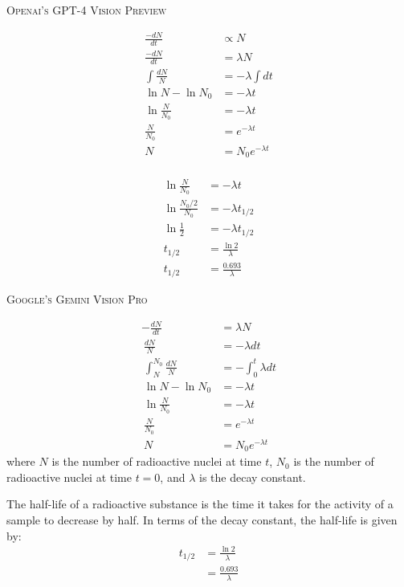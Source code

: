 \documentclass{article}
\begin{document}
\begin{center}
    \textsc{Openai's GPT-4 Vision Preview}
\end{center}

    \begin{align*}
        \frac{-dN}{dt} &\propto N \\
        \frac{-dN}{dt} &= \lambda N \\
        \int \frac{dN}{N} &= - \lambda \int dt \\
        \ln N - \ln N_0 &= -\lambda t \\
        \ln \frac{N}{N_0} &= -\lambda t \\
        \frac{N}{N_0} &= e^{-\lambda t} \\
        N &= N_0 e^{-\lambda t} \\
        \end{align*}
   
        \begin{align*}
        \ln \frac{N}{N_0} &= -\lambda t \\
        \ln \frac{N_0/2}{N_0} &= -\lambda t_{1/2} \\
        \ln \frac{1}{2} &= -\lambda t_{1/2} \\
        t_{1/2} &= \frac{\ln 2}{\lambda} \\
        t_{1/2} &= \frac{0.693}{\lambda}
        \end{align*}

        \pagebreak
\begin{center}
    \textsc{Google's Gemini Vision Pro}
\end{center}
        \begin{align*}
            -\frac{dN}{dt} &= \lambda N \\\
            \frac{dN}{N} &= -\lambda dt \\\
            \int_N^{N_0} \frac{dN}{N} &= -\int_0^t \lambda dt \\\
            \ln N - \ln N_0 &= -\lambda t \\\
            \ln \frac{N}{N_0} &= -\lambda t \\\
            \frac{N}{N_0} &= e^{-\lambda t} \\\
            N &= N_0 e^{-\lambda t}
            \end{align*}
            where $N$ is the number of radioactive nuclei at time $t$, $N_0$ is the number of radioactive nuclei at time $t = 0$,
            and $\lambda$ is the decay constant.
            
            The half-life of a radioactive substance is the time it takes for the activity of a sample to decrease by half. In terms
            of the decay constant, the half-life is given by:
            \begin{align*}
            t_{1/2} &= \frac{\ln 2}{\lambda} \\\
            &= \frac{0.693}{\lambda}
            \end{align*}
\end{document}
